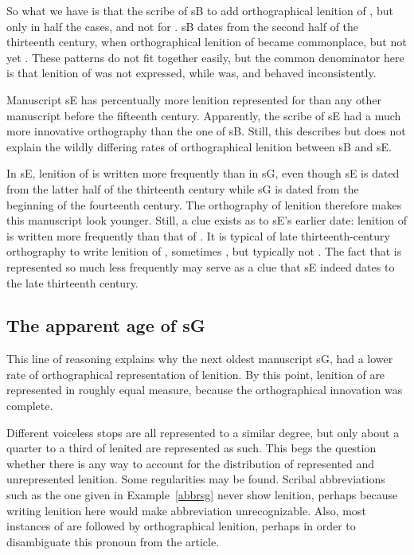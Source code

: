 So what we have is that the scribe of \gls{sB} to add orthographical lenition of , but only in half the cases, and not for . \Gls{sB} dates from the second half of the thirteenth century, when orthographical lenition of  became commonplace, but not yet . These patterns do not fit together easily, but the common denominator here is that lenition of  was not expressed, while  was, and  behaved inconsistently. 

Manuscript \gls{sE} has percentually more lenition represented for  than any other manuscript before the fifteenth century. Apparently, the scribe of \gls{sE} had a much more innovative orthography than the one of \gls{sB}. Still, this describes but does not explain the wildly differing rates of orthographical lenition between \gls{sB} and \gls{sE}.

In \gls{sE}, lenition of  is written more frequently than in \gls{sG}, even though \gls{sE} is dated from the latter half of the thirteenth century while \gls{sG} is dated from the beginning of the fourteenth century. The orthography of lenition therefore makes this manuscript look younger. Still, a clue exists as to \gls{sE}'s earlier date: lenition of  is written  more frequently than that of . It is typical of late thirteenth-century orthography to write lenition of , sometimes , but typically not . The fact that  is represented so much less frequently may serve as a clue that \gls{sE} indeed dates to the late thirteenth century.

\subsection{The apparent age of \gls{sG}}
\label{sec:apparent-age-glssg}

This line of reasoning explains why the next oldest manuscript \gls{sG}, had a lower rate of orthographical representation of lenition. By this point, lenition of  are represented in roughly equal measure, because the orthographical innovation was complete. 

Different voiceless stops are all represented to a similar degree, but only about a quarter to a third of lenited  are represented as such. This begs the question whether there is any way to account for the distribution of represented and unrepresented lenition. Some regularities may be found. Scribal abbreviations such as the one given in Example~\ref{abbrsg} never show lenition, perhaps because writing lenition here would make abbreviation unrecognizable.
Also, most instances of  are followed by orthographical lenition, perhaps in order to disambiguate this pronoun from the article.

